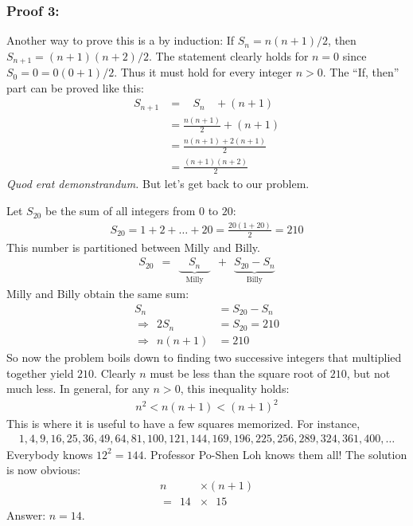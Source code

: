 \documentclass[12pt]{article}
\newenvironment{answer}{\vspace{1em}\color{blue!90!black}}{}
\newenvironment{answer}{\vspace{0em}\expandafter\comment}{\expandafter\endcomment}
\begin{document}
\begin{answer}
\subsubsection*{Proof 3:}
Another way to prove this is a by induction: If $S_{n}=n(n+1)/2$, then $S_{n+1}=(n+1)(n+2)/2$. The statement clearly holds for $n=0$ since $S_{0} = 0 = 0 (0+1)/2$. Thus it must hold for every integer $n>0$. The ``If, then'' part can be proved like this:
\begin{align*}
S_{n+1} 
  & = ~~~~ S_{n} ~~~~+ (n+1) \\
  & = \frac{n(n+1)}{2} + (n+1) \\
  & = \frac{n(n+1)+2(n+1)}{2} \\
  & = \frac{(n+1)(n+2)}{2}
\end{align*}
\textit{Quod erat demonstrandum.} But let's get back to our problem.
\bigskip

Let $S_{20}$ be the sum of all integers from $0$ to $20$:
\begin{align*}
S_{20} = 1 + 2 + \ldots + 20 
= \frac{20(1+20)}{2}
= 210
\end{align*}
This number is partitioned between Milly and Billy.
\begin{align*}
S_{20} ~~ = ~~ \underbrace{~~~~S_{n}~~~~}_{\text{Milly}} ~~+~~ \underbrace{S_{20}-S_{n}}_{\text{Billy}}
\end{align*}
Milly and Billy obtain the same sum: 
\begin{align*}
S_{n} & = S_{20}-S_{n} \\
\Rightarrow ~~
2S_{n} & = S_{20} = 210 \\
\Rightarrow ~~
n (n+1) & = 210
\end{align*}
So now the problem boils down to finding two successive integers that multiplied together yield $210$. Clearly $n$ must be less than the square root of $210$, but not much less. In general, for any $n>0$, this inequality holds:
\begin{align*}
n^2 < n(n+1) < (n+1)^2
\end{align*}
This is where it is useful to have a few squares memorized. For instance,
\begin{align*}
1, 4, 9, 16, 25, 36, 49, 64, 81, 100, 121, 144, 169, 196, 225, 256, 289, 324, 361, 400, \ldots 
\end{align*}
Everybody knows $12^2=144$. Professor Po-Shen Loh knows them all! The solution is now obvious:
\begin{align*}
n  & \times (n+1) \\
= ~~ 14 & \times ~~~ 15
\end{align*}
Answer: $n=14$.
\end{answer}
\end{document}
